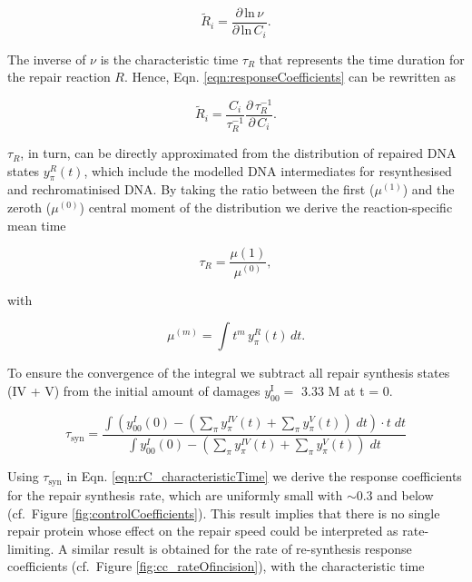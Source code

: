 \begin{equation}
\tilde{R}_i = \frac{\partial \, \text{ln} \, \nu}{\partial \, \text{ln} \, C_i}.
\label{eqn:responseCoefficients}
\end{equation}

The inverse of $\nu$ is the characteristic time $\tau_R$ that represents the time duration for the repair reaction $R$. Hence, Eqn. \ref{eqn:responseCoefficients} can be rewritten as

\begin{equation}
\tilde{R}_i = \frac{C_i}{\tau_R^{-1}} \frac{\partial  \, \tau_R^{-1}}{\partial \,  C_i}.
\label{eqn:rC_characteristicTime}   
\end{equation}

$\tau_R$, in turn, can be directly approximated from the distribution of repaired DNA states $y^R_\pi(t)$, which include the modelled DNA intermediates for resynthesised and rechromatinised DNA. By taking the ratio between the first ($\mu^{(1)}$) and the zeroth ($\mu^{(0)}$) central moment of the distribution we derive the reaction-specific mean time 

\begin{equation}
\tau_{R} = \frac{\mu{(1)}}{\mu^{(0)}}, 
\label{eqn:meanreactiontime}   
\end{equation}

with

\begin{equation}
\mu^{(m)} = \int t^m \, y^R_\pi(t)\, dt.
\label{eqn:moments}   
\end{equation}


To ensure the convergence of the integral we subtract all repair synthesis states (IV + V) from the initial amount of damages $y^{\text{I}}_{00} = $ 3.33 \textmu M at t = 0.

\begin{equation}	
\tau_{\text{syn}}=\frac{\int (y^I_{00}(0)-( \sum_ \pi  y_\pi^{IV}(t)+\sum_ \pi  y_\pi^{V}(t))\; dt)\cdot t\; dt}{\int y^I_{00}(0)-( \sum_ \pi  y_\pi^{IV}(t)+\sum_ \pi  y_\pi^{V}(t))\; dt}
\end{equation}

Using $\tau_{\text{syn}}$ in Eqn. \ref{eqn:rC_characteristicTime} we derive the response coefficients for the repair synthesis rate, which are uniformly small with $\sim$0.3 and below (cf.\ Figure \ref{fig:controlCoefficients}). This result implies that there is no single repair protein whose effect on the repair speed could be interpreted as rate-limiting. A similar result is obtained for the rate of re-synthesis response coefficients (cf.\ Figure \ref{fig:cc_rateOfincision}), with the characteristic time

